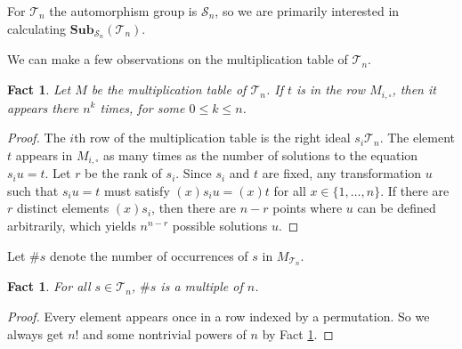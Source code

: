 \documentclass{amsart}
\newcommand{\cT}{{\mathcal T}}
\newcommand{\cS}{{\mathcal S}}
\newcommand{\Sub}{\mathbf{Sub}}
\newcommand{\todo}[1]{\textcolor{red}{ \small \textsf{[ #1 ]} \normalsize}}
\theoremstyle{plain}
\newtheorem{fact}[theorem]{Fact}
\theoremstyle{definition}
\begin{document}
 For $\cT_n$ the automorphism group is $\cS_n$, so we are primarily interested in calculating $\Sub_{\cS_n}(\cT_n)$.

We can make a few observations on the multiplication table of $\cT_n$.
\begin{fact}
\label{fact:npower}
Let $M$ be the multiplication table of $\cT_n$.
If $t$ is in the row $M_{i,\square}$, then it appears there $n^k$ times, for some $0\leq k\leq n$.
\end{fact}
\begin{proof}
The $i$th row of the multiplication table is the right  ideal $s_i\cT_n$.
The element $t$ appears in $M_{i,\square}$ as many times as the number of solutions to the equation $s_iu=t$.
Let $r$ be the rank of $s_i$. 
Since $s_i$ and $t$ are fixed, any transformation $u$ such that
  $s_iu=t$ must satisfy $(x)s_iu=(x)t$ for all $x\in \{1,\ldots, n\}$. If there
  are $r$ distinct elements $(x)s_i$, then there are $n-r$ points where $u$ can
be defined arbitrarily, which yields $n^{n-r}$ possible solutions $u$.
\end{proof}
Let $\#s$ denote the number of occurrences of $s$ in $M_{\cT_n}$.
\begin{fact}
For all $s\in\cT_n$, $\#s$ is a multiple of $n$.
\end{fact}
\begin{proof}
Every element appears once in a row indexed by a permutation.
So we always get $n!$ and some nontrivial powers of $n$ by Fact \ref{fact:npower}.
\end{proof}
\end{document}
